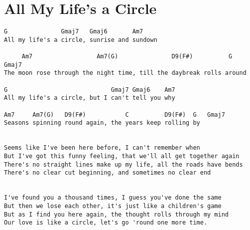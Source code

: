 \documentclass[leqno]{memoir}
\begin{document}
\chapter{All My Life's a Circle}
\begin{verbatim}
G               Gmaj7   Gmaj6       Am7
All my life's a circle, sunrise and sundown

     Am7                  Am7(G)               D9(F#)          G   Gmaj7
The moon rose through the night time, till the daybreak rolls around

G                             Gmaj7 Gmaj6    Am7
All my life's a circle, but I can't tell you why

Am7     Am7(G)   D9(F#)           C          D9(F#)  G   Gmaj7
Seasons spinning round again, the years keep rolling by


Seems like I've been here before, I can't remember when
But I've got this funny feeling, that we'll all get together again
There's no straight lines make up my life, all the roads have bends
There's no clear cut beginning, and sometimes no clear end


I've found you a thousand times, I guess you've done the same
But then we lose each other, it's just like a children's game
But as I find you here again, the thought rolls through my mind
Our love is like a circle, let's go 'round one more time.

\end{verbatim}
\newpage
\end{document}

